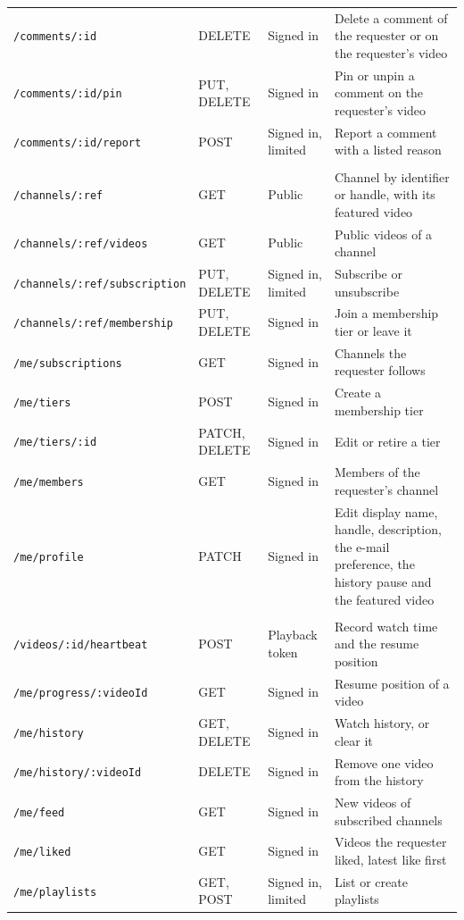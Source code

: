 \begin{footnotesize}
\begin{longtable}{>{\raggedright\arraybackslash}p{} >{\raggedright\arraybackslash}p{} >{\raggedright\arraybackslash}p{} >{\raggedright\arraybackslash}p{}}
\texttt{/comments/:id} & DELETE & Signed in & Delete a comment of the requester or on the requester's video \\
\texttt{/comments/:id/pin} & PUT, DELETE & Signed in & Pin or unpin a comment on the requester's video \\
\texttt{/comments/:id/report} & POST & Signed in, limited & Report a comment with a listed reason \\
\midrule
\multicolumn{4}{l}{\textit{Channels and memberships}} \\
\texttt{/channels/:ref} & GET & Public & Channel by identifier or handle, with its featured video \\
\texttt{/channels/:ref/videos} & GET & Public & Public videos of a channel \\
\texttt{/channels/:ref/subscription} & PUT, DELETE & Signed in, limited & Subscribe or unsubscribe \\
\texttt{/channels/:ref/membership} & PUT, DELETE & Signed in & Join a membership tier or leave it \\
\texttt{/me/subscriptions} & GET & Signed in & Channels the requester follows \\
\texttt{/me/tiers} & POST & Signed in & Create a membership tier \\
\texttt{/me/tiers/:id} & PATCH, DELETE & Signed in & Edit or retire a tier \\
\texttt{/me/members} & GET & Signed in & Members of the requester's channel \\
\texttt{/me/profile} & PATCH & Signed in & Edit display name, handle, description, the e-mail preference, the history pause and the featured video \\
\midrule
\multicolumn{4}{l}{\textit{Library}} \\
\texttt{/videos/:id/heartbeat} & POST & Playback token & Record watch time and the resume position \\
\texttt{/me/progress/:videoId} & GET & Signed in & Resume position of a video \\
\texttt{/me/history} & GET, DELETE & Signed in & Watch history, or clear it \\
\texttt{/me/history/:videoId} & DELETE & Signed in & Remove one video from the history \\
\texttt{/me/feed} & GET & Signed in & New videos of subscribed channels \\
\texttt{/me/liked} & GET & Signed in & Videos the requester liked, latest like first \\
\texttt{/me/playlists} & GET, POST & Signed in, limited & List or create playlists \\

\end{longtable}
\end{footnotesize}
